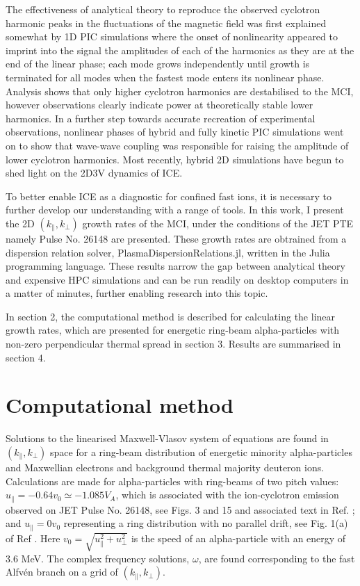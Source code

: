 \documentclass[12pt]{iopart}
\begin{document}
The effectiveness of analytical theory to reproduce the observed cyclotron harmonic peaks in the fluctuations of the magnetic field was first explained somewhat by 1D PIC simulations where the onset of nonlinearity appeared to imprint into the signal the amplitudes of each of the harmonics as they are at the end of the linear phase; each mode grows independently until growth is terminated for all modes when the fastest mode enters its nonlinear phase. Analysis shows that only higher cyclotron harmonics are destabilised\cite{McClements2015} to the MCI, however observations clearly indicate power at theoretically stable lower harmonics\cite{Cottrell1988}. In a further step towards accurate recreation of experimental observations, nonlinear phases of hybrid\cite{Carbajal2014} and fully kinetic\cite{Cook2013,Chapman2017} PIC simulations went on to show that wave-wave coupling was responsible for raising the amplitude of lower cyclotron harmonics. Most recently, hybrid 2D simulations have begun to shed light on the 2D3V dynamics of ICE\cite{Carbajal2021}.

To better enable ICE as a diagnostic for confined fast ions, it is necessary to further develop our understanding with a range of tools. In this work, I present the 2D $(k_\parallel, k_\perp)$ growth rates of the MCI, under the conditions of the JET PTE\cite{Cottrell1993} namely Pulse No. 26148 are presented. These growth rates are obtrained from a dispersion relation solver, PlasmaDispersionRelations.jl, written in the Julia programming language\cite{Bezanson2017}. These results narrow the gap between analytical theory and expensive HPC simulations and can be run readily on desktop computers in a matter of minutes, further enabling research into this topic. 

In section 2, the computational method is described for calculating the linear growth rates, which are presented for energetic ring-beam alpha-particles with non-zero perpendicular thermal spread in section 3. Results are summarised in section 4.

\section{Computational method}

Solutions to the linearised Maxwell-Vlasov system of equations are found in $(k_\parallel, k_\bot)$ space for a ring-beam distribution of energetic minority alpha-particles and Maxwellian electrons and background thermal majority deuteron ions. Calculations are made for alpha-particles with ring-beams of two pitch values: $u_\parallel=-0.64 v_0 \simeq -1.085 V_A$, which is associated with the ion-cyclotron emission observed on JET Pulse No. 26148, see Figs. 3 and 15 and associated text in Ref. \cite{Cottrell1993}; and $u_\parallel=0 v_0$ representing a ring distribution with no parallel drift, see Fig. 1(a) of Ref \cite{Cook2013}. Here $v_0=\sqrt{u_\parallel^2 + u_\perp^2}$ is the speed of an alpha-particle with an energy of 3.6 MeV. The complex frequency solutions, $\omega$, are found corresponding to the fast Alfv{\'e}n branch on a grid of $(k_\parallel, k_\bot)$. 
\end{document}

